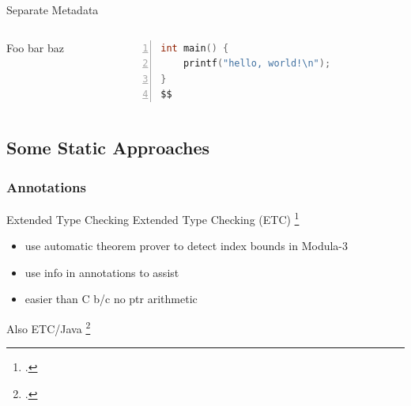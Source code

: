 \documentclass[aspectratio=169]{beamer}
\begin{document}
\begin{frame}[fragile]{Separate Metadata}
  \footnotesize
  \begin{columns}[T]
    \begin{column}{0.45\textwidth}
        Foo bar baz
    \end{column}
    \begin{column}{0.45\textwidth}
%      
       \begin{lstlisting}[language=C,numbers=left,mathescape,basicstyle={\footnotesize\ttfamily}]
int main() {
    printf("hello, world!\n");
}
$$
        \end{lstlisting}
    \end{column}
  \end{columns}
\end{frame}

\subsection{Some Static Approaches}

\subsubsection{Annotations}

\begin{frame}[fragile]{Extended Type Checking}
Extended Type Checking (ETC) \footcite{detlefs_overview_1995}
    \begin{itemize}
      \item use automatic theorem prover to detect index bounds in Modula-3
      \item use info in annotations to assist
      \item easier than C b/c no ptr arithmetic
    \end{itemize}
Also ETC/Java \footcite{flanagan_extended_2002}
\end{frame}
\end{document}
